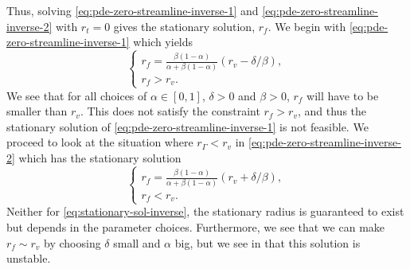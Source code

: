 Thus, solving \eqref{eq:pde-zero-streamline-inverse-1} and \eqref{eq:pde-zero-streamline-inverse-2} with $r_t=0$ gives the stationary solution, $r_f$. We begin with \eqref{eq:pde-zero-streamline-inverse-1} which yields  
\begin{equation*}
\begin{cases}
    r_f = \frac{\beta (1-\alpha)}{\alpha + \beta (1-\alpha)} (r_v-\delta/\beta), \\
    r_f > r_v.
\end{cases}
\end{equation*}
We see that for all choices of $\alpha \in [0, 1]$, $\delta>0$ and $\beta>0$, $r_f$ will have to be smaller than $r_v$. This does not satisfy the constraint $r_f>r_v$, and thus the stationary solution of \eqref{eq:pde-zero-streamline-inverse-1} is not feasible. We proceed to look at the situation where $r_{\Gamma}<r_v$ in \eqref{eq:pde-zero-streamline-inverse-2} which has the stationary solution
\begin{equation}
\begin{cases}
    r_f = \frac{\beta (1-\alpha)}{\alpha + \beta (1-\alpha)} (r_v+\delta/\beta), \\
    r_f < r_v.
\end{cases}
\label{eq:stationary-sol-inverse}
\end{equation}
Neither for \eqref{eq:stationary-sol-inverse}, the stationary radius is guaranteed to exist but depends in the parameter choices. Furthermore, we see that we can make $r_f \sim r_v$ by choosing $\delta$ small and $\alpha$ big, but we see in  that this solution is unstable. 

